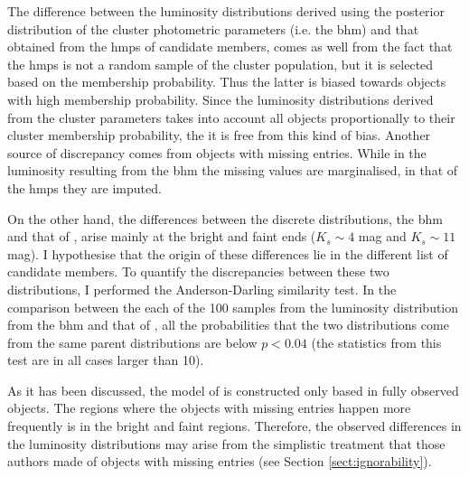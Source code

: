 The difference between the luminosity distributions derived using the posterior distribution of the cluster photometric parameters (i.e. the \gls{bhm}) and that obtained from the \gls{hmps} of candidate members, comes as well from the fact that the \gls{hmps} is not a random sample of the cluster population, but it is selected based on the membership probability. Thus the latter is biased towards objects with high membership probability. Since the luminosity distributions derived from the cluster parameters takes into account all objects proportionally to their cluster membership probability, the it is free from this kind of bias. Another source of discrepancy comes from objects with missing entries. While in the luminosity resulting from the \gls{bhm} the missing values are marginalised, in that of the \gls{hmps} they are imputed.
 
On the other hand, the differences between the discrete distributions, the \gls{bhm} and that of \citet{Bouy2015}, arise mainly at the bright and faint ends ($K_s\sim 4$ mag and $K_s\sim11$ mag). I hypothesise that the origin of these differences lie in the different list of candidate members. To quantify the discrepancies between these two distributions, I performed the Anderson-Darling similarity test. In the comparison between the each of the 100 samples from the luminosity distribution from the \gls{bhm} and that of \citet{Bouy2015}, all the probabilities that the two distributions come from the same parent distributions are below $p< 0.04$ (the statistics from this test are in all cases larger than 10).

As it has been discussed, the model of \citet{Bouy2015} is constructed only based in fully observed objects. The regions where the objects with missing entries happen more frequently is in the bright and faint regions. Therefore, the observed differences in the luminosity distributions may arise from the simplistic treatment that those authors made of objects with missing entries (see Section \ref{sect:ignorability}).

